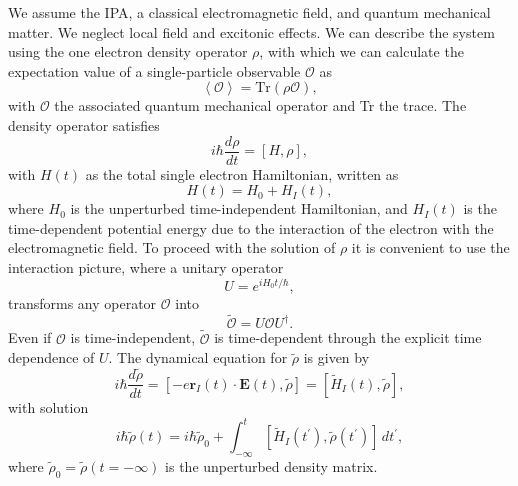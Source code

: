 We assume the IPA, a classical electromagnetic field, and quantum mechanical
matter. We neglect local field and excitonic effects. We can describe the system
using the one electron density operator ${\rho}$, with which we can calculate
the expectation value of a single-particle observable $\mathcal{O}$ as
\begin{equation}\label{traza}
\left\langle\mathcal{O}\right\rangle
= \mathrm{Tr}(\rho\mathcal{O}),
\end{equation}
with $\mathcal{O}$ the associated quantum mechanical operator and Tr the 
trace. The density operator satisfies
\begin{equation}\label{eqrho}
i\hbar \frac{d\rho}{dt} = \left[H,\rho\right],
\end{equation}
with $H(t)$ as the total single electron Hamiltonian, written as 
\begin{equation*}
H(t) = H_{0} + H_{I}(t),  
\label{achea}
\end{equation*}
where $H_{0}$ is the unperturbed time-independent Hamiltonian, and $H_{I}(t)$ is
the time-dependent potential energy due to the interaction of the electron with
the electromagnetic field. To proceed with the solution of $\rho$ it is
convenient to use the interaction picture, where a unitary operator
\begin{equation}\label{ou}
U = e^{iH_{0}t/\hbar},
\end{equation}
transforms any operator $\mathcal{O}$ into
\begin{equation}\label{ip}
\tilde{\mathcal{O}} = U\mathcal{O}U^{\dagger}.
\end{equation}
Even if $\mathcal{O}$ is time-independent, $\tilde{\mathcal{O}}$ is
time-dependent through the explicit time dependence of $U$. The dynamical
equation for $\tilde{\rho}$ is given by
\begin{equation}\label{intrho}
i\hbar \frac{d\tilde{\rho}}{dt}
= \left[-e\mathbf{r}_{I}(t)\cdot\mathbf{E}(t),\tilde{\rho}\right]
= [\tilde{H}_{I}(t), \tilde{\rho}],
\end{equation}
with solution 
\begin{equation}\label{intrho2}
i\hbar \tilde{\rho}(t)
= i\hbar \tilde{\rho}_{0} + 
\int_{-\infty}^{t}
\left[\tilde{H}_{I}(t^{\prime}),\tilde{\rho}(t^{\prime})\right]\,dt^{\prime},  
\end{equation}
where $\tilde{\rho}_{0} = \tilde{\rho}(t = -\infty)$ is the unperturbed density
matrix.

